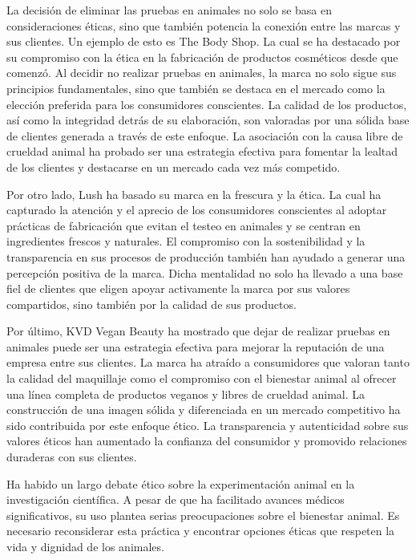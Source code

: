 \documentclass[letterpaper, 12pt]{report}
\begin{document}
La decisión de eliminar las pruebas en animales no solo se basa en
consideraciones éticas, sino que también potencia la conexión entre las
marcas y sus clientes. Un ejemplo de esto es The Body Shop. La cual se ha
destacado por su compromiso con la ética en la fabricación de productos
cosméticos desde que comenzó. Al decidir no realizar pruebas en animales,
la marca no solo sigue sus principios fundamentales, sino que también se 
destaca en el mercado como la elección preferida para los consumidores 
conscientes. La calidad de los productos, así como la integridad detrás de 
su elaboración, son valoradas por una sólida base de clientes generada a 
través de este enfoque. La asociación con la causa libre de crueldad animal 
ha probado ser una estrategia efectiva para fomentar la lealtad de los 
clientes y destacarse en un mercado cada vez más competido.

Por otro lado, Lush ha basado su marca en la frescura y la ética. La cual 
ha capturado la atención y el aprecio de los consumidores conscientes al 
adoptar prácticas de fabricación que evitan el testeo en animales y se 
centran en ingredientes frescos y naturales. El compromiso con la 
sostenibilidad y la transparencia en sus procesos de producción también 
han ayudado a generar una percepción positiva de la marca. Dicha mentalidad 
no solo ha llevado a una base fiel de clientes que eligen apoyar activamente 
la marca por sus valores compartidos, sino también por la calidad 
de sus productos.

Por último, KVD Vegan Beauty ha mostrado que dejar de realizar pruebas en 
animales puede ser una estrategia efectiva para mejorar la reputación de una 
empresa entre sus clientes. La marca ha atraído a consumidores que valoran 
tanto la calidad del maquillaje como el compromiso con el bienestar animal
al ofrecer una línea completa de productos veganos y libres de crueldad 
animal. La construcción de una imagen sólida y diferenciada en un mercado
competitivo ha sido contribuida por este enfoque ético. La transparencia y 
autenticidad sobre sus valores éticos han aumentado la confianza del 
consumidor y promovido relaciones duraderas con sus clientes.

Ha habido un largo debate ético sobre la experimentación animal en la 
investigación científica. A pesar de que ha facilitado avances médicos 
significativos, su uso plantea serias preocupaciones sobre el bienestar 
animal. Es necesario reconsiderar esta práctica y encontrar opciones éticas 
que respeten la vida y dignidad de los animales.
\end{document}
